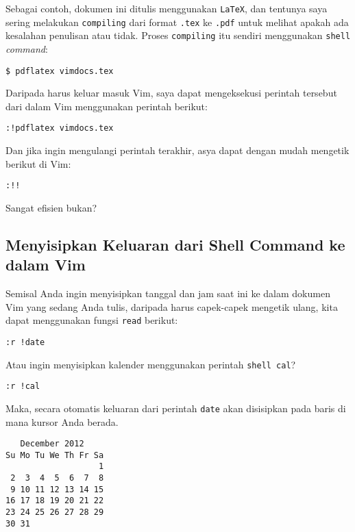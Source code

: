 \documentclass{article}
\begin{document}
Sebagai contoh, dokumen ini ditulis menggunakan
\verb=LaTeX=, dan tentunya saya sering melakukan
\verb=compiling= dari format \verb=.tex= ke \verb=.pdf=
untuk melihat apakah ada kesalahan penulisan atau tidak.
Proses \verb=compiling= itu sendiri menggunakan \verb=shell=
\emph{command}:

\begin{verbatim}
$ pdflatex vimdocs.tex
\end{verbatim}

Daripada harus keluar masuk Vim, saya dapat mengeksekusi
perintah tersebut dari dalam Vim menggunakan perintah
berikut:

\begin{verbatim}
:!pdflatex vimdocs.tex
\end{verbatim}

Dan jika ingin mengulangi perintah terakhir, asya dapat
dengan mudah mengetik berikut di Vim:

\begin{verbatim}
:!!
\end{verbatim}

Sangat efisien bukan?

\subsection{Menyisipkan Keluaran dari Shell Command ke dalam
Vim}

Semisal Anda ingin menyisipkan tanggal dan jam saat ini ke
dalam dokumen Vim yang sedang Anda tulis, daripada harus
capek-capek mengetik ulang, kita dapat menggunakan fungsi
\verb=read= berikut:

\begin{verbatim}
:r !date
\end{verbatim}

Atau ingin menyisipkan kalender menggunakan perintah
\verb=shell cal=?

\begin{verbatim}
:r !cal
\end{verbatim}

Maka, secara otomatis keluaran dari perintah \verb=date=
akan disisipkan pada baris di mana kursor Anda berada.

\begin{verbatim}
   December 2012      
Su Mo Tu We Th Fr Sa  
                   1  
 2  3  4  5  6  7  8  
 9 10 11 12 13 14 15  
16 17 18 19 20 21 22  
23 24 25 26 27 28 29  
30 31                 
\end{verbatim}
\end{document}
